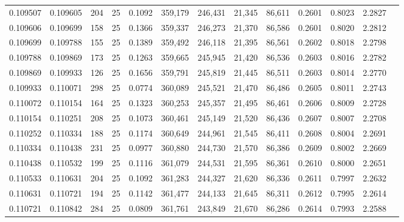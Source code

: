 \begin{tabular}{rrrrrrrrrrrrr}
0.109507 & 0.109605 &   204 &  25 &                                     0.1092 & 359,179 & 246,431 &  21,345 &  86,611 & 0.2601 & 0.8023 & 2.2827 \\
0.109606 & 0.109699 &   158 &  25 &                                     0.1366 & 359,337 & 246,273 &  21,370 &  86,586 & 0.2601 & 0.8020 & 2.2812 \\
0.109699 & 0.109788 &   155 &  25 &                                     0.1389 & 359,492 & 246,118 &  21,395 &  86,561 & 0.2602 & 0.8018 & 2.2798 \\
0.109788 & 0.109869 &   173 &  25 &                                     0.1263 & 359,665 & 245,945 &  21,420 &  86,536 & 0.2603 & 0.8016 & 2.2782 \\
0.109869 & 0.109933 &   126 &  25 &                                     0.1656 & 359,791 & 245,819 &  21,445 &  86,511 & 0.2603 & 0.8014 & 2.2770 \\
0.109933 & 0.110071 &   298 &  25 &                                     0.0774 & 360,089 & 245,521 &  21,470 &  86,486 & 0.2605 & 0.8011 & 2.2743 \\
0.110072 & 0.110154 &   164 &  25 &                                     0.1323 & 360,253 & 245,357 &  21,495 &  86,461 & 0.2606 & 0.8009 & 2.2728 \\
0.110154 & 0.110251 &   208 &  25 &                                     0.1073 & 360,461 & 245,149 &  21,520 &  86,436 & 0.2607 & 0.8007 & 2.2708 \\
0.110252 & 0.110334 &   188 &  25 &                                     0.1174 & 360,649 & 244,961 &  21,545 &  86,411 & 0.2608 & 0.8004 & 2.2691 \\
0.110334 & 0.110438 &   231 &  25 &                                     0.0977 & 360,880 & 244,730 &  21,570 &  86,386 & 0.2609 & 0.8002 & 2.2669 \\
0.110438 & 0.110532 &   199 &  25 &                                     0.1116 & 361,079 & 244,531 &  21,595 &  86,361 & 0.2610 & 0.8000 & 2.2651 \\
0.110533 & 0.110631 &   204 &  25 &                                     0.1092 & 361,283 & 244,327 &  21,620 &  86,336 & 0.2611 & 0.7997 & 2.2632 \\
0.110631 & 0.110721 &   194 &  25 &                                     0.1142 & 361,477 & 244,133 &  21,645 &  86,311 & 0.2612 & 0.7995 & 2.2614 \\
0.110721 & 0.110842 &   284 &  25 &                                     0.0809 & 361,761 & 243,849 &  21,670 &  86,286 & 0.2614 & 0.7993 & 2.2588 \\

\end{tabular}
